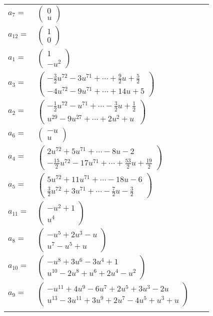 \documentclass[1p]{elsarticle_modified}
\theoremstyle{definition}
\begin{document}
\begin{tabular}{m{7pt} m{180pt} m{7pt} m{180pt} }
\flushright $a_{7}=$&$\begin{pmatrix}0\\u\end{pmatrix}$ \\
\flushright $a_{12}=$&$\begin{pmatrix}1\\0\end{pmatrix}$ \\
\flushright $a_{1}=$&$\begin{pmatrix}1\\- u^2\end{pmatrix}$ \\
\flushright $a_{3}=$&$\begin{pmatrix}-\frac{3}{2} u^{72}-3 u^{71}+\cdots+\frac{9}{2} u+\frac{5}{2}\\-4 u^{72}-9 u^{71}+\cdots+14 u+5\end{pmatrix}$ \\
\flushright $a_{2}=$&$\begin{pmatrix}-\frac{1}{2} u^{72}- u^{71}+\cdots-\frac{3}{2} u+\frac{1}{2}\\u^{29}-9 u^{27}+\cdots+2 u^2+u\end{pmatrix}$ \\
\flushright $a_{6}=$&$\begin{pmatrix}- u\\u\end{pmatrix}$ \\
\flushright $a_{4}=$&$\begin{pmatrix}2 u^{72}+5 u^{71}+\cdots-8 u-2\\-\frac{15}{2} u^{72}-17 u^{71}+\cdots+\frac{53}{2} u+\frac{19}{2}\end{pmatrix}$ \\
\flushright $a_{5}=$&$\begin{pmatrix}5 u^{72}+11 u^{71}+\cdots-18 u-6\\\frac{3}{2} u^{72}+3 u^{71}+\cdots-\frac{7}{2} u-\frac{3}{2}\end{pmatrix}$ \\
\flushright $a_{11}=$&$\begin{pmatrix}- u^2+1\\u^4\end{pmatrix}$ \\
\flushright $a_{8}=$&$\begin{pmatrix}- u^5+2 u^3- u\\u^7- u^5+u\end{pmatrix}$ \\
\flushright $a_{10}=$&$\begin{pmatrix}- u^8+3 u^6-3 u^4+1\\u^{10}-2 u^8+u^6+2 u^4- u^2\end{pmatrix}$ \\
\flushright $a_{9}=$&$\begin{pmatrix}- u^{11}+4 u^9-6 u^7+2 u^5+3 u^3-2 u\\u^{13}-3 u^{11}+3 u^9+2 u^7-4 u^5+u^3+u\end{pmatrix}$\\&\end{tabular}
\end{document}

